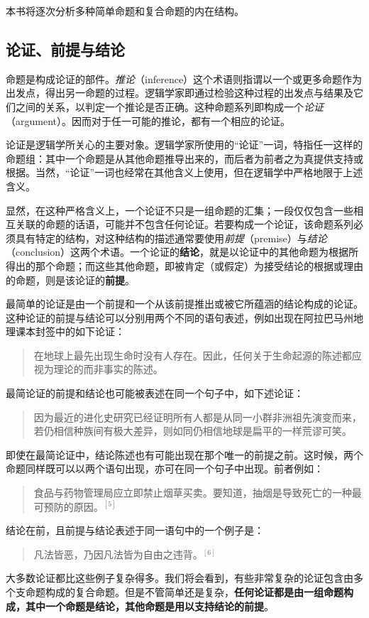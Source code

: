 本书将逐次分析多种简单命题和复合命题的内在结构。

\subsection{论证、前提与结论}
命题是构成论证的部件。\emph{推论}（inference）这个术语则指谓以一个或更多命题作为出发点，得出另一命题的过程。逻辑学家即通过检验这种过程的出发点与结果及它们之间的关系，以判定一个推论是否正确。这种命题系列即构成一个\emph{论证}（argument）。因而对于任一可能的推论，都有一个相应的论证。

论证是逻辑学所关心的主要对象。逻辑学家所使用的“论证”一词，特指任一这样的命题组：其中一个命题是从其他命题推导出来的，而后者为前者之为真提供支持或根据。当然，“论证”一词也经常在其他含义上使用，但在逻辑学中严格地限于上述含义。

显然，在这种严格含义上，一个论证不只是一组命题的汇集；一段仅仅包含一些相互关联的命题的话语，可能并不包含任何论证。若要构成一个论证，该命题系列必须具有特定的结构，对这种结构的描述通常要使用\emph{前提}（premise）与\emph{结论}（conclusion）这两个术语。一个论证的\textbf{结论}，就是以论证中的其他命题为根据所得出的那个命题；而这些其他命题，即被肯定（或假定）为接受结论的根据或理由的命题，则是该论证的\textbf{前提}。

最简单的论证是由一个前提和一个从该前提推出或被它所蕴涵的结论构成的论证。这种论证的前提与结论可以分别用两个不同的语句表述，例如出现在阿拉巴马州地理课本封签中的如下论证：
\begin{quote}
在地球上最先出现生命时没有人存在。因此，任何关于生命起源的陈述都应视为理论的而非事实的陈述。
\end{quote}
最简论证的前提和结论也可能被表述在同一个句子中，如下述论证：
\begin{quote}
因为最近的进化史研究已经证明所有人都是从同一小群非洲祖先演变而来，若仍相信种族间有极大差异，则如同仍相信地球是扁平的一样荒谬可笑。
\end{quote}
即使在最简论证中，结论陈述也有可能出现在那个唯一的前提之前。这时候，两个命题同样既可以以两个语句出现，亦可在同一个句子中出现。前者例如：
\begin{quote}
食品与药物管理局应立即禁止烟草买卖。要知道，抽烟是导致死亡的一种最可预防的原因。${ }^{[5]}$
\end{quote}
结论在前，且前提与结论表述于同一语句中的一个例子是：
\begin{quote}
凡法皆恶，乃因凡法皆为自由之违背。${ }^{[6]}$
\end{quote}
大多数论证都比这些例子复杂得多。我们将会看到，有些非常复杂的论证包含由多个支命题构成的复合命题。但是不管简单还是复杂，\textbf{任何论证都是由一组命题构成，其中一个命题是结论，其他命题是用以支持结论的前提}。

